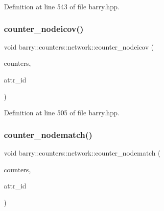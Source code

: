 Definition at line 543 of file barry.\+hpp.

\mbox{\label{namespacebarry_1_1counters_1_1network_a42073ab360a9f796126662927acc5470}} 
\subsubsection{\texorpdfstring{counter\+\_\+nodeicov()}{counter\_nodeicov()}}
{\footnotesize\ttfamily void barry\+::counters\+::network\+::counter\+\_\+nodeicov (\begin{DoxyParamCaption}\item[{\hyperlink{namespacebarry_1_1counters_1_1network_aa72fdb34752ac24167a06ee196a8fff6}{Net\+Counters} $\ast$}]{counters,  }\item[{\hyperlink{namespacebarry_a11dfc53ddb4672278319aa04f1e09a6c}{uint}}]{attr\+\_\+id }\end{DoxyParamCaption})\hspace{0.3cm}{\ttfamily [inline]}}



Definition at line 505 of file barry.\+hpp.

\mbox{\label{namespacebarry_1_1counters_1_1network_a2333b5893d1ba684925be6855bc33868}} 
\subsubsection{\texorpdfstring{counter\+\_\+nodematch()}{counter\_nodematch()}}
{\footnotesize\ttfamily void barry\+::counters\+::network\+::counter\+\_\+nodematch (\begin{DoxyParamCaption}\item[{\hyperlink{namespacebarry_1_1counters_1_1network_aa72fdb34752ac24167a06ee196a8fff6}{Net\+Counters} $\ast$}]{counters,  }\item[{\hyperlink{namespacebarry_a11dfc53ddb4672278319aa04f1e09a6c}{uint}}]{attr\+\_\+id }\end{DoxyParamCaption})\hspace{0.3cm}{\ttfamily [inline]}}




